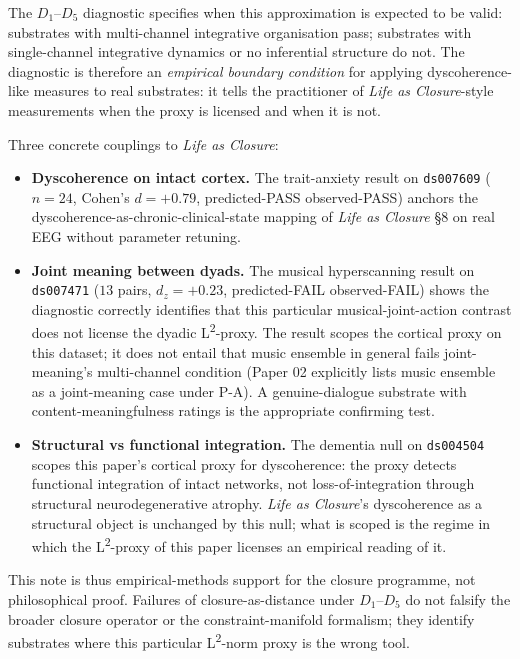 \documentclass[11pt,a4paper]{article}
\begin{document}
The $D_1$--$D_5$ diagnostic specifies when this approximation is expected to be valid: substrates with multi-channel integrative organisation pass; substrates with single-channel integrative dynamics or no inferential structure do not. The diagnostic is therefore an \emph{empirical boundary condition} for applying dyscoherence-like measures to real substrates: it tells the practitioner of \emph{Life as Closure}-style measurements when the proxy is licensed and when it is not.

Three concrete couplings to \emph{Life as Closure}:
\begin{itemize}\itemsep0pt
\item \textbf{Dyscoherence on intact cortex.} The trait-anxiety result on \texttt{ds007609} ($n = 24$, Cohen's $d = +0.79$, predicted-PASS observed-PASS) anchors the dyscoherence-as-chronic-clinical-state mapping of \emph{Life as Closure} §8 on real EEG without parameter retuning.
\item \textbf{Joint meaning between dyads.} The musical hyperscanning result on \texttt{ds007471} ($13$ pairs, $d_z = +0.23$, predicted-FAIL observed-FAIL) shows the diagnostic correctly identifies that this particular musical-joint-action contrast does not license the dyadic L\textsuperscript{2}-proxy. The result scopes the cortical proxy on this dataset; it does not entail that music ensemble in general fails joint-meaning's multi-channel condition (Paper 02 explicitly lists music ensemble as a joint-meaning case under P-A). A genuine-dialogue substrate with content-meaningfulness ratings is the appropriate confirming test.
\item \textbf{Structural vs functional integration.} The dementia null on \texttt{ds004504} scopes this paper's cortical proxy for dyscoherence: the proxy detects functional integration of intact networks, not loss-of-integration through structural neurodegenerative atrophy. \emph{Life as Closure}'s dyscoherence as a structural object is unchanged by this null; what is scoped is the regime in which the L\textsuperscript{2}-proxy of this paper licenses an empirical reading of it.
\end{itemize}

This note is thus empirical-methods support for the closure programme, not philosophical proof. Failures of closure-as-distance under $D_1$--$D_5$ do not falsify the broader closure operator or the constraint-manifold formalism; they identify substrates where this particular L\textsuperscript{2}-norm proxy is the wrong tool.
\end{document}
